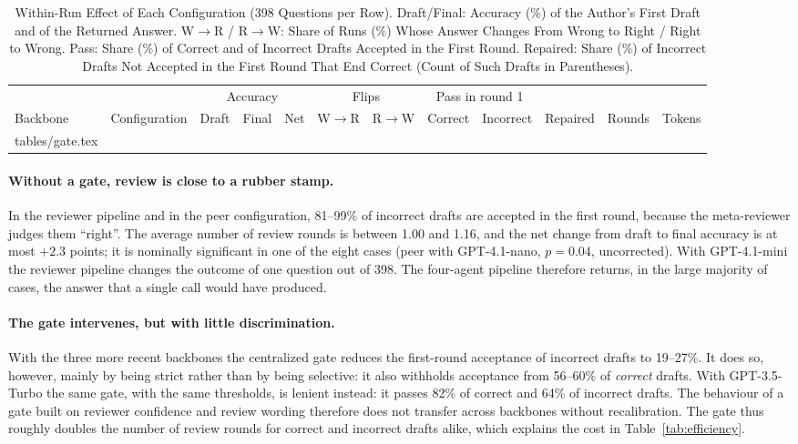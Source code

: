 \documentclass[lettersize,journal]{IEEEtran}
\makeatletter
\newcommand{\tabinput}[1]{\@@input #1 }
\makeatother
\begin{document}
\begin{table}[!t]
\caption{Within-Run Effect of Each Configuration (398 Questions per Row). Draft/Final: Accuracy (\%) of the Author's First Draft and of the Returned Answer. W$\to$R / R$\to$W: Share of Runs (\%) Whose Answer Changes From Wrong to Right / Right to Wrong. Pass: Share (\%) of Correct and of Incorrect Drafts Accepted in the First Round. Repaired: Share (\%) of Incorrect Drafts Not Accepted in the First Round That End Correct (Count of Such Drafts in Parentheses).}
\label{tab:gate}
\centering
\small
\setlength{\tabcolsep}{4.5pt}
\begin{tabular}{ll ccc cc cc c cc}
\toprule
 & & \multicolumn{3}{c}{Accuracy} & \multicolumn{2}{c}{Flips} & \multicolumn{2}{c}{Pass in round 1} & & & \\
\cmidrule(lr){3-5}\cmidrule(lr){6-7}\cmidrule(lr){8-9}
Backbone & Configuration & Draft & Final & Net & W$\to$R & R$\to$W & Correct & Incorrect & Repaired & Rounds & Tokens \\
\midrule
\tabinput{tables/gate.tex}
\bottomrule
\end{tabular}
\end{table}

\paragraph{Without a gate, review is close to a rubber stamp.}
In the reviewer pipeline and in the peer configuration, 81--99\% of incorrect drafts are accepted in the first round, because the meta-reviewer judges them ``right''.
The average number of review rounds is between 1.00 and 1.16, and the net change from draft to final accuracy is at most \(+2.3\) points; it is nominally significant in one of the eight cases (peer with GPT-4.1-nano, \(p=0.04\), uncorrected).
With GPT-4.1-mini the reviewer pipeline changes the outcome of one question out of 398.
The four-agent pipeline therefore returns, in the large majority of cases, the answer that a single call would have produced.

\paragraph{The gate intervenes, but with little discrimination.}
With the three more recent backbones the centralized gate reduces the first-round acceptance of incorrect drafts to 19--27\%.
It does so, however, mainly by being strict rather than by being selective: it also withholds acceptance from 56--60\% of \emph{correct} drafts.
With GPT-3.5-Turbo the same gate, with the same thresholds, is lenient instead: it passes 82\% of correct and 64\% of incorrect drafts. The behaviour of a gate built on reviewer confidence and review wording therefore does not transfer across backbones without recalibration.
The gate thus roughly doubles the number of review rounds for correct and incorrect drafts alike, which explains the cost in Table~\ref{tab:efficiency}.
\end{document}
